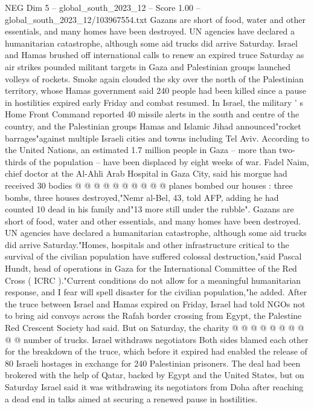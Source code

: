\begin{textsample}{NEG Dim 5 – global\_south\_2023\_12 – Score 1.00 – global\_south\_2023\_12/103967554.txt}  \label{ex:f5_neg_236}
Gazans are short of food, water and other essentials, and many homes have been destroyed.
UN agencies have declared a humanitarian catastrophe, although some aid trucks did arrive Saturday.
Israel and Hamas brushed off international calls to renew an expired truce Saturday as air strikes pounded militant targets in Gaza and Palestinian groups launched volleys of rockets.
Smoke again clouded the sky over the north of the Palestinian territory, whose Hamas government said 240 people had been killed since a pause in hostilities expired early Friday and combat resumed.
In Israel, the military ' s Home Front Command reported 40 missile alerts in the south and centre of the country, and the Palestinian groups Hamas and Islamic Jihad announced"rocket barrages"against multiple Israeli cities and towns including Tel Aviv.
According to the United Nations, an estimated 1.7 million people in Gaza -- more than two-thirds of the population -- have been displaced by eight weeks of war.
Fadel Naim, chief doctor at the Al-Ahli Arab Hospital in Gaza City, said his morgue had received 30 bodies @ @ @ @ @ @ @ @ @ @ planes bombed our houses : three bombs, three houses destroyed,"Nemr al-Bel, 43, told AFP, adding he had counted 10 dead in his family and"13 more still under the rubble".
Gazans are short of food, water and other essentials, and many homes have been destroyed.
UN agencies have declared a humanitarian catastrophe, although some aid trucks did arrive Saturday."Homes, hospitals and other infrastructure critical to the survival of the civilian population have suffered colossal destruction,"said Pascal Hundt, head of operations in Gaza for the International Committee of the Red Cross ( ICRC )."Current conditions do not allow for a meaningful humanitarian response, and I fear will spell disaster for the civilian population,"he added.
After the truce between Israel and Hamas expired on Friday, Israel had told NGOs not to bring aid convoys across the Rafah border crossing from Egypt, the Palestine Red Crescent Society had said.
But on Saturday, the charity @ @ @ @ @ @ @ @ @ @ number of trucks.
Israel withdraws negotiators Both sides blamed each other for the breakdown of the truce, which before it expired had enabled the release of 80 Israeli hostages in exchange for 240 Palestinian prisoners.
The deal had been brokered with the help of Qatar, backed by Egypt and the United States, but on Saturday Israel said it was withdrawing its negotiators from Doha after reaching a dead end in talks aimed at securing a renewed pause in hostilities.

\end{textsample}
